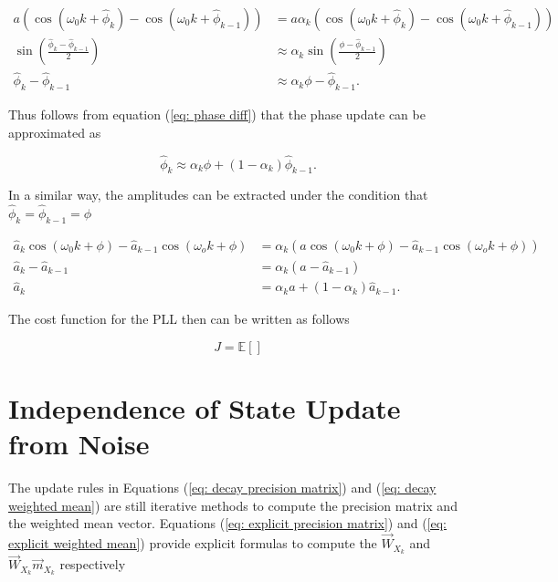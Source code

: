 \documentclass[11pt,a4paper,twoside]{report}
\newcommand{\messF}[3]{\overrightarrow{#1}_{{#2}_{k{#3}}}}
\begin{document}
\begin{align}
	a\left(\cos{\left(\omega_0k + \hat{\phi}_k\right)}- \cos{\left(\omega_0k + \hat{\phi}_{k-1}\right)}\right) &= 
	a\alpha_k\left(\cos{\left(\omega_0k + \hat{\phi}_k\right)}- \cos{\left(\omega_0k + \hat{\phi}_{k-1}\right)}\right) \\
	\sin{\left(\frac{\hat{\phi}_k - \hat{\phi}_{k-1}}{2}\right)} &\approx \alpha_k\sin{\left(\frac{\phi - \hat{\phi}_{k-1}}{2}\right)} \\
	\label{eq: phase diff}
	\hat{\phi}_k - \hat{\phi}_{k-1} &\approx \alpha_k\phi - \hat{\phi}_{k-1}.
\end{align}

Thus follows from equation (\ref{eq: phase diff}) that the phase update can be approximated as

\begin{equation}
	\hat{\phi}_k \approx \alpha_k\phi + \left(1-\alpha_k\right)\hat{\phi}_{k-1}.
\end{equation}


In a similar way, the amplitudes can be extracted under the condition that $\hat{\phi}_k = \hat{\phi}_{k-1} = \phi$

\begin{align}
	\hat{a}_k\cos{\left(\omega_0k + \phi\right)} - \hat{a}_{k-1}\cos{\left(\omega_ok + \phi\right)} &= \alpha_k\left(a\cos{\left(\omega_0k + \phi\right)} - \hat{a}_{k-1}\cos{\left(\omega_ok + \phi\right)}\right) \\
	\hat{a}_k - \hat{a}_{k-1} &= \alpha_k\left(a-\hat{a}_{k-1}\right) \\
	\hat{a}_k &= \alpha_ka + \left(1-\alpha_k\right)\hat{a}_{k-1}.
\end{align}

The cost function for the PLL then can be written as follows

\begin{equation}
	J = \mathbb{E}\left[\right]
\end{equation}




\chapter{Independence of State Update from Noise}

The update rules in Equations (\ref{eq: decay precision matrix}) and (\ref{eq: decay weighted mean}) are still iterative methods to compute the precision matrix and the weighted mean vector. Equations (\ref{eq: explicit precision matrix}) and (\ref{eq: explicit weighted mean}) provide explicit formulas to compute the $\messF{W}{X}{}$ and $\messF{W}{X}{}\messF{m}{X}{}$ respectively
\end{document}

